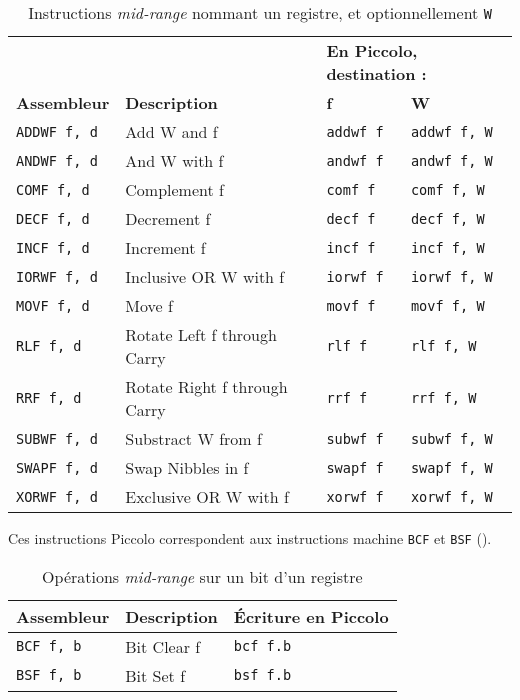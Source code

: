\begin{table}[!ht]
  \centering
  \small
  \begin{tabular}{llll}
     &  & \multicolumn{2}{l}{\textbf{En Piccolo, destination :}} \\
    \textbf{Assembleur} & \textbf{Description} & \textbf{f} & \textbf{W}\\
    \hline
    \texttt{ADDWF f, d} & Add W and f & \texttt{addwf f}  & \texttt{addwf f, W} \\
    \texttt{ANDWF f, d} & And W with f & \texttt{andwf f} & \texttt{andwf f, W}\\
    \texttt{COMF f, d} & Complement f & \texttt{comf f} & \texttt{comf f, W}\\
    \texttt{DECF f, d} & Decrement f & \texttt{decf f} & \texttt{decf f, W}\\
    \texttt{INCF f, d} & Increment f & \texttt{incf f}& \texttt{incf f, W}\\
    \texttt{IORWF f, d} & Inclusive OR W with f & \texttt{iorwf f} & \texttt{iorwf f, W}\\
    \texttt{MOVF f, d} & Move f & \texttt{movf f} & \texttt{movf f, W}\\
    \texttt{RLF f, d} & Rotate Left f through Carry & \texttt{rlf f} & \texttt{rlf f, W}\\
    \texttt{RRF f, d} & Rotate Right f through Carry & \texttt{rrf f} & \texttt{rrf f, W}\\
    \texttt{SUBWF f, d} & Substract W from f & \texttt{subwf f} & \texttt{subwf f, W}\\
    \texttt{SWAPF f, d} & Swap Nibbles in f & \texttt{swapf f} & \texttt{swapf f, W}\\
    \texttt{XORWF f, d} & Exclusive OR W with f & \texttt{xorwf f} & \texttt{xorwf f, W}\\
  \hline
  \end{tabular}
  \caption{Instructions \emph{mid-range} nommant un registre, et optionnellement \texttt{W}}
\end{table}



Ces instructions Piccolo correspondent aux instructions machine \texttt{BCF} et \texttt{BSF} ().

\begin{table}[!ht]
  \centering
  \small
  \begin{tabular}{lll}
    \textbf{Assembleur} & \textbf{Description} & \textbf{Écriture en Piccolo}\\
    \hline
    \texttt{BCF f, b} & Bit Clear f & \texttt{bcf f.b} \\
    \texttt{BSF f, b} & Bit Set f & \texttt{bsf f.b} \\
  \hline
  \end{tabular}
  \caption{Opérations \emph{mid-range} sur un bit d'un registre}
\end{table}


